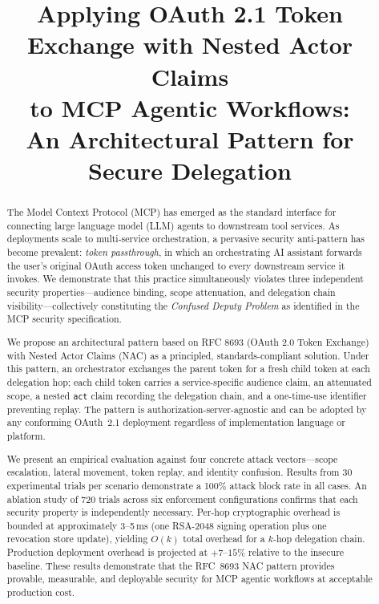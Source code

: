 \documentclass[journal]{IEEEtran}
\begin{document}
\title{Applying OAuth 2.1 Token Exchange with Nested Actor Claims\\
to MCP Agentic Workflows:\\
An Architectural Pattern for Secure Delegation}

\author{
}

\maketitle

\begin{abstract}
The Model Context Protocol (MCP) has emerged as the standard interface for
connecting large language model (LLM) agents to downstream tool services.
As deployments scale to multi-service orchestration, a pervasive security
anti-pattern has become prevalent: \textit{token passthrough}, in which an
orchestrating AI assistant forwards the user's original OAuth access token
unchanged to every downstream service it invokes. We demonstrate that this
practice simultaneously violates three independent security properties---audience
binding, scope attenuation, and delegation chain visibility---collectively
constituting the \textit{Confused Deputy Problem} as identified in the MCP
security specification.

We propose an architectural pattern based on RFC 8693 (OAuth 2.0 Token Exchange)
with Nested Actor Claims (NAC) as a principled, standards-compliant solution.
Under this pattern, an orchestrator exchanges the parent token for a fresh child
token at each delegation hop; each child token carries a service-specific audience
claim, an attenuated scope, a nested \texttt{act} claim recording the delegation
chain, and a one-time-use identifier preventing replay. The pattern is
authorization-server-agnostic and can be adopted by any conforming OAuth~2.1
deployment regardless of implementation language or platform.

We present an empirical evaluation against four concrete attack vectors---scope
escalation, lateral movement, token replay, and identity confusion. Results from
30 experimental trials per scenario demonstrate a 100\% attack block rate in all
cases. An ablation study of 720 trials across six enforcement configurations
confirms that each security property is independently necessary. Per-hop
cryptographic overhead is bounded at approximately 3--5\,ms (one RSA-2048 signing
operation plus one revocation store update), yielding $O(k)$ total overhead for a
$k$-hop delegation chain. Production deployment overhead is projected at
$+7$--$15\%$ relative to the insecure baseline. These results demonstrate that the
RFC~8693 NAC pattern provides provable, measurable, and deployable security for
MCP agentic workflows at acceptable production cost.
\end{abstract}
\end{document}
